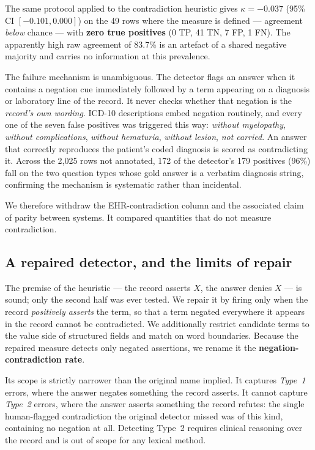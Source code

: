 The same protocol applied to the contradiction heuristic gives
$\kappa = -0.037$ (95\% CI $[-0.101, 0.000]$) on the 49 rows where the measure
is defined --- agreement \emph{below} chance --- with \textbf{zero true
positives} (0 TP, 41 TN, 7 FP, 1 FN). The apparently high raw agreement of
83.7\% is an artefact of a shared negative majority and carries no information
at this prevalence.

The failure mechanism is unambiguous. The detector flags an answer when it
contains a negation cue immediately followed by a term appearing on a diagnosis
or laboratory line of the record. It never checks whether that negation is the
\emph{record's own wording}. ICD-10 descriptions embed negation routinely, and
every one of the seven false positives was triggered this way: \emph{without
myelopathy}, \emph{without complications}, \emph{without hematuria},
\emph{without lesion}, \emph{not carried}. An answer that correctly reproduces
the patient's coded diagnosis is scored as contradicting it. Across the 2{,}025
rows not annotated, 172 of the detector's 179 positives (96\%) fall on the two
question types whose gold answer is a verbatim diagnosis string, confirming the
mechanism is systematic rather than incidental.

We therefore withdraw the EHR-contradiction column and the associated claim of
parity between systems. It compared quantities that do not measure
contradiction.

\subsection{A repaired detector, and the limits of repair}

The premise of the heuristic --- the record asserts $X$, the answer denies $X$
--- is sound; only the second half was ever tested. We repair it by firing only
when the record \emph{positively asserts} the term, so that a term negated
everywhere it appears in the record cannot be contradicted. We additionally
restrict candidate terms to the value side of structured fields and match on
word boundaries. Because the repaired measure detects only negated assertions,
we rename it the \textbf{negation-contradiction rate}.

Its scope is strictly narrower than the original name implied. It captures
\emph{Type~1} errors, where the answer negates something the record asserts. It
cannot capture \emph{Type~2} errors, where the answer asserts something the
record refutes: the single human-flagged contradiction the original detector
missed was of this kind, containing no negation at all. Detecting Type~2
requires clinical reasoning over the record and is out of scope for any lexical
method.

